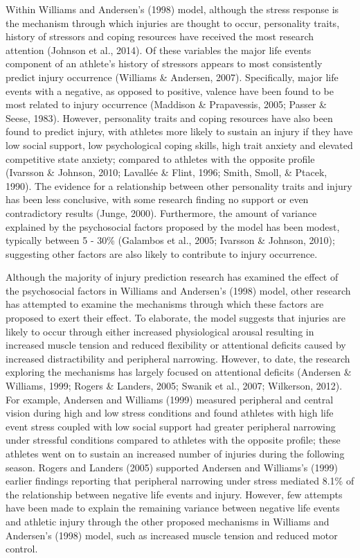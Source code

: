 \documentclass[man,floatsintext]{apa6}
\begin{document}
Within Williams and Andersen's (1998) model, although the stress response is the mechanism through which injuries are thought to occur, personality traits, history of stressors and coping resources have received the most research attention (Johnson et al., 2014).
Of these variables the major life events component of an athlete's history of stressors appears to most consistently predict injury occurrence (Williams \& Andersen, 2007).
Specifically, major life events with a negative, as opposed to positive, valence have been found to be most related to injury occurrence (Maddison \& Prapavessis, 2005; Passer \& Seese, 1983).
However, personality traits and coping resources have also been found to predict injury, with athletes more likely to sustain an injury if they have low social support, low psychological coping skills, high trait anxiety and elevated competitive state anxiety; compared to athletes with the opposite profile (Ivarsson \& Johnson, 2010; Lavallée \& Flint, 1996; Smith, Smoll, \& Ptacek, 1990).
The evidence for a relationship between other personality traits and injury has been less conclusive, with some research finding no support or even contradictory results (Junge, 2000).
Furthermore, the amount of variance explained by the psychosocial factors proposed by the model has been modest, typically between 5 - 30\% (Galambos et al., 2005; Ivarsson \& Johnson, 2010); suggesting other factors are also likely to contribute to injury occurrence.

Although the majority of injury prediction research has examined the effect of the psychosocial factors in Williams and Andersen's (1998) model, other research has attempted to examine the mechanisms through which these factors are proposed to exert their effect.
To elaborate, the model suggests that injuries are likely to occur through either increased physiological arousal resulting in increased muscle tension and reduced flexibility or attentional deficits caused by increased distractibility and peripheral narrowing. However, to date, the research exploring the mechanisms has largely focused on attentional deficits (Andersen \& Williams, 1999; Rogers \& Landers, 2005; Swanik et al., 2007; Wilkerson, 2012).
For example, Andersen and Williams (1999)
measured peripheral and central vision during high and low stress conditions and found athletes with high life event stress coupled with low social support had greater peripheral narrowing under stressful conditions compared to athletes with the opposite profile; these athletes went on to sustain an increased number of injuries during the following season.
Rogers and Landers (2005) supported Andersen and Williams's (1999) earlier findings reporting that peripheral narrowing under stress mediated 8.1\% of the relationship between negative life events and injury.
However, few attempts have been made to explain the remaining variance between negative life events and athletic injury through the other proposed mechanisms in Williams and Andersen's (1998) model, such as increased muscle tension and reduced motor control.
\end{document}
